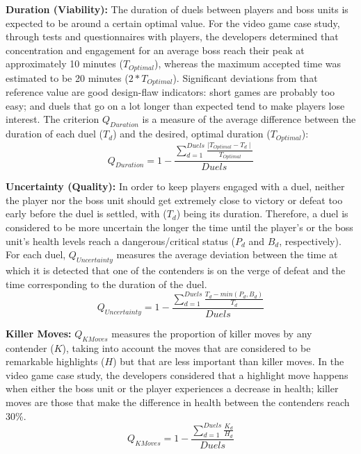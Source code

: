 {\bf Duration (Viability):} The duration of duels between players and boss units is expected to be around a certain optimal value. For the video game case study, through tests and questionnaires with players, the developers determined that concentration and engagement for an average boss reach their peak at approximately 10 minutes ($T_{Optimal}$), whereas the maximum accepted time was estimated to be 20 minutes ($2*T_{Optimal}$). Significant deviations from that reference value are good design-flaw indicators: short games are probably too easy; and duels that go on a lot longer than expected tend to make players lose interest. The criterion $Q_{Duration}$ is a measure of the average difference between the duration of each duel ($T_{d}$) and the desired, optimal duration ($T_{Optimal}$):
\begin{equation}
Q_{Duration} =  1 - \frac{\sum\limits_{d=1}^{Duels}\frac{\mid T_{Optimal} - T_{d} \mid}{T_{Optimal}}}{Duels} 
\end{equation}


 {\bf Uncertainty (Quality):} In order to keep players engaged with a duel, neither the player nor the boss unit should get extremely close to victory or defeat too early before the duel is settled, with ($T_{d}$) being its duration. Therefore, a duel is considered to be more uncertain the longer the time until the player's or the boss unit's health levels reach a dangerous/critical status ($P_{d}$ and $B_{d}$, respectively). For each duel, $Q_{Uncertainty}$ measures the average deviation between the time at which it is detected that one of the contenders is on the verge of defeat and the time corresponding to the duration of the duel.
\begin{equation}
Q_{Uncertainty} =  1 - \frac{\sum\limits_{d=1}^{Duels}\frac{T_{d} - min\left ( P_{d}, B_{d} \right )}{T_{d}}}{Duels} 
\end{equation}

{\bf Killer Moves:}   $Q_{KMoves}$ measures the proportion of killer moves by any contender ($K$), taking into account the moves that are considered to be remarkable highlights ($H$) but that are less important than killer moves. In the video game case study, the developers considered that a highlight move happens when either the boss unit or the player experiences a decrease in health; killer moves are those that make the difference in health between the contenders reach 30\%.
\begin{equation}
Q_{KMoves} =  1 - \frac{\sum\limits_{d=1}^{Duels}\frac{K_{d}}{H_{d}}}{Duels} 
\end{equation}

